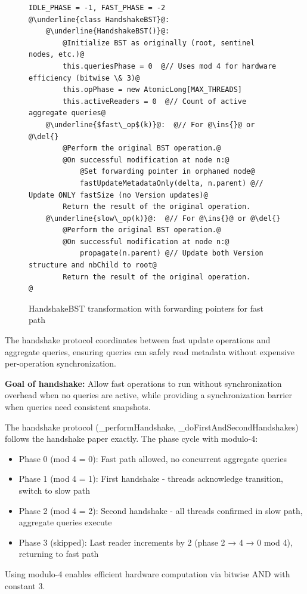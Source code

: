 \documentclass[acmsmall,screen,nonacm]{acmart}
\newcommand{\codestyle}[1]{{{\fontsize{9}{10}\ttfamily #1}}}
\newcommand{\ins}{\codestyle{in\-sert}}
\newcommand{\del}{\codestyle{de\-lete}}
\begin{document}
\begin{figure}[H]
\begin{lstlisting}
IDLE_PHASE = -1, FAST_PHASE = -2
@\underline{class HandshakeBST}@:
    @\underline{HandshakeBST()}@:
        @Initialize BST as originally (root, sentinel nodes, etc.)@
        this.queriesPhase = 0  @// Uses mod 4 for hardware efficiency (bitwise \& 3)@
        this.opPhase = new AtomicLong[MAX_THREADS]
        this.activeReaders = 0  @// Count of active aggregate queries@
    @\underline{$fast\_op$(k)}@:  @// For @\ins{}@ or @\del{}
        @Perform the original BST operation.@
        @On successful modification at node n:@
            @Set forwarding pointer in orphaned node@
            fastUpdateMetadataOnly(delta, n.parent) @// Update ONLY fastSize (no Version updates)@
        Return the result of the original operation.
    @\underline{slow\_op(k)}@:  @// For @\ins{}@ or @\del{}
        @Perform the original BST operation.@
        @On successful modification at node n:@
            propagate(n.parent) @// Update both Version structure and nbChild to root@
        Return the result of the original operation.
@
\end{lstlisting}
\caption{HandshakeBST transformation with forwarding pointers for fast path}
\label{fig:mybstnext-transformation}
\end{figure}


The handshake protocol coordinates between fast update operations and aggregate queries, ensuring queries can safely read metadata without expensive per-operation synchronization.

\textbf{Goal of handshake:} Allow fast operations to run without synchronization overhead when no queries are active, while providing a synchronization barrier when queries need consistent snapshots.

The handshake protocol (\codestyle{\_performHandshake}, \codestyle{\_doFirstAndSecondHandshakes}) follows the handshake paper exactly. The phase cycle with modulo-4:
\begin{itemize}
\item Phase 0 (mod 4 = 0): Fast path allowed, no concurrent aggregate queries
\item Phase 1 (mod 4 = 1): First handshake - threads acknowledge transition, switch to slow path  
\item Phase 2 (mod 4 = 2): Second handshake - all threads confirmed in slow path, aggregate queries execute
\item Phase 3 (skipped): Last reader increments by 2 (phase 2 → 4 → 0 mod 4), returning to fast path
\end{itemize}
Using modulo-4 enables efficient hardware computation via bitwise AND with constant 3.
\end{document}
